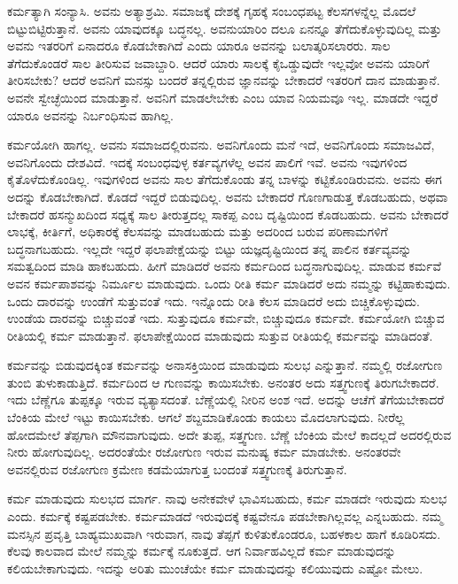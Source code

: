 ಕರ್ಮತ್ಯಾಗಿ ಸಂನ್ಯಾಸಿ. ಅವನು ಅತ್ಯಾಶ್ರಮಿ. ಸಮಾಜಕ್ಕೆ ದೇಶಕ್ಕೆ ಗೃಹಕ್ಕೆ ಸಂಬಂಧಪಟ್ಟ ಕೆಲಸಗಳನ್ನೆಲ್ಲ ಮೊದಲೆ ಬಿಟ್ಟುಬಿಟ್ಟಿರುತ್ತಾನೆ. ಅವನು ಯಾವುದಕ್ಕೂ ಬದ್ಧನಲ್ಲ. ಅವನು\break ಯಾರಿಂ ದಲೂ ಏನನ್ನೂ ತೆಗೆದುಕೊಳ್ಳುವುದಿಲ್ಲ ಮತ್ತು ಅವನು ಇತರರಿಗೆ ಏನಾದರೂ ಕೊಡ\-ಬೇಕಾಗಿದೆ ಎಂದು ಯಾರೂ ಅವನನ್ನು ಬಲಾತ್ಕರಿಸಲಾರರು. ಸಾಲ ತೆಗೆದುಕೊಂಡರೆ ಸಾಲ ತೀರಿಸುವ ಜವಾಬ್ದಾರಿ. ಆದರೆ ಯಾರು ಸಾಲಕ್ಕೆ ಕೈಒಡ್ಡುವುದೇ ಇಲ್ಲವೋ ಅವನು ಯಾರಿಗೆ ತೀರಿಸಬೇಕು? ಆದರೆ ಅವನಿಗೆ ಮನಸ್ಸು ಬಂದರೆ ತನ್ನಲ್ಲಿರುವ ಜ್ಞಾನವನ್ನು ಬೇಕಾದರೆ ಇತರರಿಗೆ ದಾನ ಮಾಡುತ್ತಾನೆ. ಅವನೇ ಸ್ವೇಚ್ಛೆಯಿಂದ ಮಾಡುತ್ತಾನೆ. ಅವನಿಗೆ ಮಾಡಲೇಬೇಕು ಎಂಬ ಯಾವ ನಿಯಮವೂ ಇಲ್ಲ. ಮಾಡದೇ ಇದ್ದರೆ ಯಾರೂ ಅವನನ್ನು ನಿರ್ಬಂಧಿಸುವ ಹಾಗಿಲ್ಲ.

ಕರ್ಮಯೋಗಿ ಹಾಗಲ್ಲ. ಅವನು ಸಮಾಜದಲ್ಲಿರುವನು. ಅವನಿಗೊಂದು ಮನೆ ಇದೆ, ಅವನಿಗೊಂದು ಸಮಾಜವಿದೆ, ಅವನಿಗೊಂದು ದೇಶವಿದೆ. ಇದಕ್ಕೆ ಸಂಬಂಧವುಳ್ಳ ಕರ್ತವ್ಯಗಳೆಲ್ಲ ಅವನ ಪಾಲಿಗೆ ಇವೆ. ಅವನು ಇವುಗಳಿಂದ ಕೈತೊಳೆದುಕೊಂಡಿಲ್ಲ. ಇವುಗಳಿಂದ ಅವನು ಸಾಲ ತೆಗೆದುಕೊಂಡು ತನ್ನ ಬಾಳನ್ನು ಕಟ್ಟಿಕೊಂಡಿರುವನು. ಅವನು ಈಗ ಅದನ್ನು ಕೊಡಬೇಕಾಗಿದೆ. ಕೊಡದೆ ಇದ್ದರೆ ಬಿಡುವುದಿಲ್ಲ. ಅವನು ಬೇಕಾದರೆ ಗೊಣಗಾಡುತ್ತ ಕೊಡಬಹುದು, ಅಥವಾ ಬೇಕಾದರೆ ಹಸನ್ಮುಖದಿಂದ ಸಧ್ಯಕ್ಕೆ ಸಾಲ ತೀರುತ್ತದಲ್ಲ ಸಾಕಪ್ಪ ಎಂಬ ದೃಷ್ಟಿಯಿಂದ ಕೊಡಬಹುದು. ಅವನು ಬೇಕಾದರೆ ಲಾಭಕ್ಕೆ, ಕೀರ್ತಿಗೆ, ಅಧಿಕಾರಕ್ಕೆ ಕೆಲಸವನ್ನು ಮಾಡಬಹುದು ಮತ್ತು ಅದರಿಂದ ಬರುವ ಪರಿಣಾಮಗಳಿಗೆ ಬದ್ಧನಾಗಬಹುದು. ಇಲ್ಲದೇ ಇದ್ದರೆ ಫಲಾಪೇಕ್ಷೆಯನ್ನು ಬಿಟ್ಟು ಯಜ್ಞದೃಷ್ಟಿಯಿಂದ ತನ್ನ ಪಾಲಿನ ಕರ್ತವ್ಯವನ್ನು ಸಮತ್ವದಿಂದ ಮಾಡಿ ಹಾಕಬಹುದು. ಹೀಗೆ ಮಾಡಿದರೆ ಅವನು ಕರ್ಮದಿಂದ ಬದ್ಧನಾಗುವುದಿಲ್ಲ. ಮಾಡುವ ಕರ್ಮವೆ ಅವನ ಕರ್ಮಪಾಶವನ್ನು ನಿರ್ಮೂಲ ಮಾಡುವುದು. ಒಂದು ರೀತಿ ಕರ್ಮ ಮಾಡಿದರೆ ಅದು ನಮ್ಮನ್ನು ಕಟ್ಟಿಹಾಕುವುದು. ಒಂದು ದಾರವನ್ನು ಉಂಡೆಗೆ ಸುತ್ತುವಂತೆ ಇದು. ಇನ್ನೊಂದು ರೀತಿ ಕೆಲಸ ಮಾಡಿದರೆ ಅದು ಬಿಚ್ಚಿಕೊಳ್ಳುವುದು. ಉಂಡೆಯ ದಾರವನ್ನು ಬಿಚ್ಚುವಂತೆ ಇದು. ಸುತ್ತುವುದೂ ಕರ್ಮವೇ, ಬಿಚ್ಚುವುದೂ ಕರ್ಮವೇ. ಕರ್ಮಯೋಗಿ ಬಿಚ್ಚುವ ರೀತಿಯಲ್ಲಿ ಕರ್ಮ ಮಾಡುತ್ತಾನೆ. ಫಲಾಪೇಕ್ಷೆಯಿಂದ ಮಾಡುವುದು ಸುತ್ತುವ ರೀತಿಯಲ್ಲಿ ಕರ್ಮವನ್ನು ಮಾಡಿದಂತೆ.

ಕರ್ಮವನ್ನು ಬಿಡುವುದಕ್ಕಿಂತ ಕರ್ಮವನ್ನು ಅನಾಸಕ್ತಿಯಿಂದ ಮಾಡುವುದು ಸುಲಭ ಎನ್ನುತ್ತಾನೆ. ನಮ್ಮಲ್ಲಿ ರಜೋಗುಣ ತುಂಬಿ ತುಳುಕಾಡುತ್ತಿದೆ. ಕರ್ಮದಿಂದ ಆ ಗುಣವನ್ನು ಕಾಯಿಸಬೇಕು. ಅನಂತರ ಅದು ಸತ್ತ್ವಗುಣಕ್ಕೆ ತಿರುಗಬೇಕಾದರೆ. ಇದು ಬೆಣ್ಣೆಗೂ ತುಪ್ಪಕ್ಕೂ ಇರುವ ವ್ಯತ್ಯಾಸದಂತೆ. ಬೆಣ್ಣೆಯಲ್ಲಿ ನೀರಿನ ಅಂಶ ಇದೆ. ಅದನ್ನು ಆಚೆಗೆ ತೆಗೆಯಬೇಕಾದರೆ ಬೆಂಕಿಯ ಮೇಲೆ ಇಟ್ಟು ಕಾಯಿಸಬೇಕು. ಆಗಲೆ ಶಬ್ದಮಾಡಿಕೊಂಡು ಕಾಯಲು ಮೊದಲಾಗುವುದು. ನೀರೆಲ್ಲ ಹೋದಮೇಲೆ ತೆಪ್ಪಗಾಗಿ ಮೌನವಾಗುವುದು. ಅದೇ ತುಪ್ಪ, ಸತ್ತ್ವಗುಣ. ಬೆಣ್ಣೆ ಬೆಂಕಿಯ ಮೇಲೆ ಕಾದಲ್ಲದೆ ಅದರಲ್ಲಿರುವ ನೀರು ಹೋಗುವುದಿಲ್ಲ. ಅದರಂತೆಯೇ ರಜೋಗುಣ ಇರುವ ಮನುಷ್ಯ ಕರ್ಮ ಮಾಡಬೇಕು. ಅನಂತರವೇ ಅವನಲ್ಲಿರುವ ರಜೋಗುಣ ಕ್ರಮೇಣ ಕಡಮೆಯಾಗುತ್ತ ಬಂದಂತೆ ಸತ್ತ್ವಗುಣಕ್ಕೆ ತಿರುಗುತ್ತಾನೆ.

ಕರ್ಮ ಮಾಡುವುದು ಸುಲಭದ ಮಾರ್ಗ. ನಾವು ಅನೇಕವೇಳೆ ಭಾವಿಸಬಹುದು, ಕರ್ಮ ಮಾಡದೇ ಇರುವುದು ಸುಲಭ ಎಂದು. ಕರ್ಮಕ್ಕೆ ಕಷ್ಟಪಡಬೇಕು. ಕರ್ಮಮಾಡದೆ ಇರುವುದಕ್ಕೆ ಕಷ್ಟವೇನೂ ಪಡಬೇಕಾಗಿಲ್ಲವಲ್ಲ ಎನ್ನಬಹುದು. ನಮ್ಮ ಮನಸ್ಸಿನ ಪ್ರವೃತ್ತಿ ಬಾಹ್ಯಮುಖವಾಗಿ ಇರುವಾಗ, ನಾವು ತೆಪ್ಪಗೆ ಕುಳಿತುಕೊಂಡರೂ, ಬಹಳಕಾಲ ಹಾಗೆ ಕೂಡಿರಿಸದು. ಕೆಲವು ಕಾಲವಾದ ಮೇಲೆ ನಮ್ಮನ್ನು ಕರ್ಮಕ್ಕೆ ನೂಕುತ್ತದೆ. ಆಗ ನಿರ್ವಾಹವಿಲ್ಲದೆ ಕರ್ಮ ಮಾಡುವುದನ್ನು ಕಲಿಯಬೇಕಾಗುವುದು. ಇದನ್ನು ಅರಿತು ಮುಂಚೆಯೇ ಕರ್ಮ ಮಾಡುವುದನ್ನು ಕಲಿಯುವುದು ಎಷ್ಟೋ ಮೇಲು.

